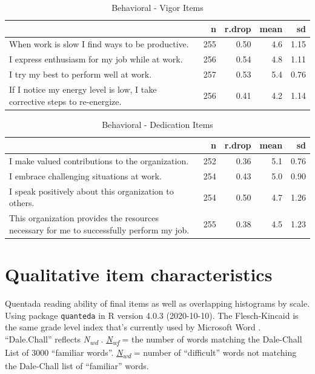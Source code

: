 \documentclass[
]{book}
\begin{document}
\begin{table}

\caption{\label{tab:rdrop14}Behavioral - Vigor Items}
\centering
\begin{tabular}[t]{l|r|r|r|r}
\hline
  & n & r.drop & mean & sd\\
\hline
When work is slow I find ways to be productive. & 255 & 0.50 & 4.6 & 1.15\\
\hline
I express enthusiasm for my job while at work. & 256 & 0.54 & 4.8 & 1.11\\
\hline
I try my best to perform well at work. & 257 & 0.53 & 5.4 & 0.76\\
\hline
If I notice my energy level is low, I take corrective steps to re-energize. & 256 & 0.41 & 4.2 & 1.14\\
\hline
\end{tabular}
\end{table}

\begin{table}

\caption{\label{tab:rdrop15}Behavioral - Dedication Items}
\centering
\begin{tabular}[t]{l|r|r|r|r}
\hline
  & n & r.drop & mean & sd\\
\hline
I make valued contributions to the organization. & 252 & 0.36 & 5.1 & 0.76\\
\hline
I embrace challenging situations at work. & 254 & 0.43 & 5.0 & 0.90\\
\hline
I speak positively about this organization to others. & 254 & 0.50 & 4.7 & 1.26\\
\hline
This organization provides the resources necessary for me to successfully perform my job. & 255 & 0.38 & 4.5 & 1.23\\
\hline
\end{tabular}
\end{table}

\hypertarget{qualitative}{%
\chapter{Qualitative item characteristics}\label{qualitative}}

Quentada reading ability of final items as well as overlapping histograms by scale. Using package \texttt{quanteda} in R version 4.0.3 (2020-10-10). The Flesch-Kincaid is the same grade level index that's currently used by Microsoft Word \citep{kincaid_derivation_1975}. ``Dale.Chall'' reflects \emph{N\textsubscript{wd}} \citep[``difficulty'' of words;][]{chall_dale_1995}. \href{https://quanteda.io/reference/textstat_readability.html}{\emph{N\textsubscript{wf}}} = the number of words matching the Dale-Chall List of 3000 ``familiar words''. \href{https://quanteda.io/reference/textstat_readability.html}{\emph{N\textsubscript{wd}}} = number of ``difficult'' words not matching the Dale-Chall list of ``familiar'' words.
\end{document}
